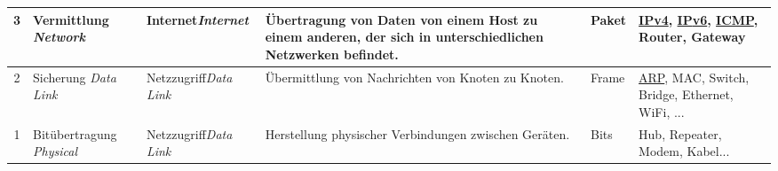 \begin{tabular}{c|m{2.6cm}||m{2cm}||m{4.6cm}|m{2.5cm}|m{2cm}}
		\rowcolor{\networkLayerColor!20}3 & Vermittlung \newline \textit{Network}      & Internet\newline\textit{Internet}     & Übertragung von Daten von einem Host zu einem anderen, der sich in unterschiedlichen Netzwerken befindet.       & Paket                                     & \underline{\acrshort{IP}v4}, \underline{\acrshort{IP}v6}, \underline{\acrshort{ICMP}}, Router, Gateway   \\\midrule
		\rowcolor{\dataLinkLayerColor!30}2      & Sicherung \newline \textit{Data Link}      & Netzzugriff\newline\textit{Data Link} & Übermittlung von Nachrichten von Knoten zu Knoten.                                                              & Frame                                     & \underline{\acrshort{ARP}}, \acrshort{MAC}, Switch, Bridge, Ethernet, \acrshort{WiFi}, ...      \\\midrule
		\rowcolor{\dataLinkLayerColor!15}1      & Bitübertragung \newline \textit{Physical}  & Netzzugriff\newline\textit{Data Link} & Herstellung physischer Verbindungen zwischen Geräten.                                                           & Bits                                      & Hub, Repeater, Modem, Kabel...        \\
	\end{tabular}